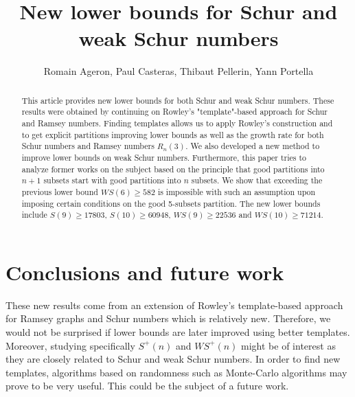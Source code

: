 \documentclass{article}
\title{New lower bounds for Schur and weak Schur numbers}
\author{Romain Ageron, Paul Casteras, Thibaut Pellerin, Yann Portella}
\newtheorem{computational theorem}{Computational Theorem}[section]
\newcommand{\WS}{\mathit{WS}}
\begin{document}
\maketitle

\begin{abstract}

This article provides new lower bounds for both Schur and weak Schur numbers. These results were obtained by 
continuing on Rowley's "template"-based approach for Schur and Ramsey numbers. Finding templates allows us to 
apply Rowley's construction and to get explicit partitions improving lower bounds as well as the growth rate for 
both Schur numbers and Ramsey numbers \(R_n(3)\). We also developed a new method to improve lower bounds on 
weak Schur numbers. Furthermore, this paper tries to analyze former works on the subject based on the principle 
that good partitions into \(n+1\) subsets start with good partitions into \(n\) subsets. We show that exceeding the 
previous lower bound \(\WS (6) \geqslant 582\) is impossible with such an assumption upon imposing certain conditions 
on the good 5-subsets partition. The new lower bounds include \(S(9) \geqslant 17803\), \(S(10) \geqslant 60948\),
\(\WS (9) \geqslant 22536 \) and \(\WS (10) \geqslant 71214 \).

\end{abstract}













\section{Conclusions and future work}

\qquad These new results come from an extension of Rowley's template-based approach for Ramsey graphs and 
Schur numbers which is relatively new. Therefore, we would not be surprised if lower bounds are later improved 
using better templates. Moreover, studying specifically \(S^+(n)\) and \(\WS^+(n)\) might be of interest as they
 are closely related to Schur and weak Schur numbers. In order to find new templates, algorithms based on 
randomness such as Monte-Carlo algorithms may prove to be very useful. This could be the subject of a future work.
\end{document}
